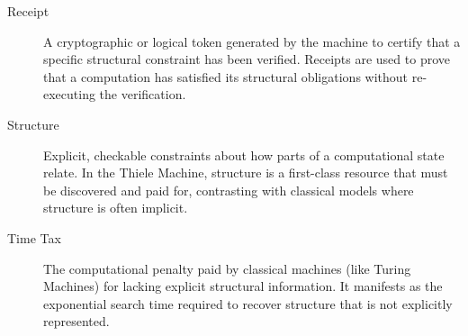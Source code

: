 \begin{description}
    \item[Receipt] A cryptographic or logical token generated by the machine to certify that a specific structural constraint has been verified. Receipts are used to prove that a computation has satisfied its structural obligations without re-executing the verification.

    \item[Structure] Explicit, checkable constraints about how parts of a computational state relate. In the Thiele Machine, structure is a first-class resource that must be discovered and paid for, contrasting with classical models where structure is often implicit.

    \item[Time Tax] The computational penalty paid by classical machines (like Turing Machines) for lacking explicit structural information. It manifests as the exponential search time required to recover structure that is not explicitly represented.

\end{description}
